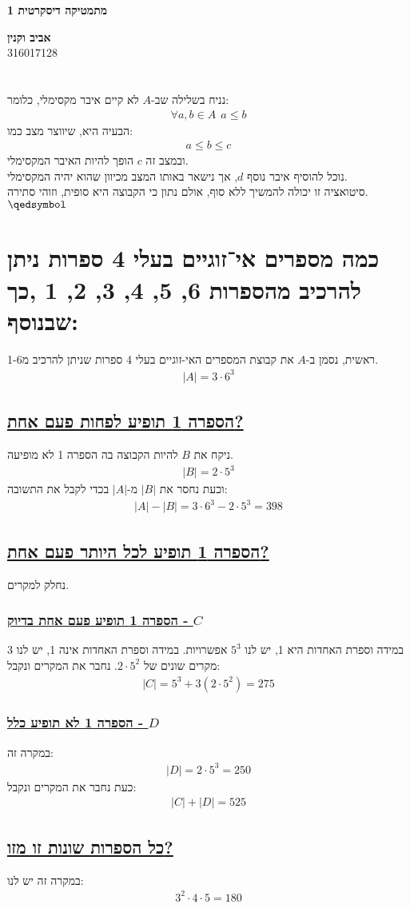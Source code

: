 \documentclass[a4paper, 12pt, leqno]{article}
\newcommand{\sub}[1]{\subsection{\underline{#1}}}
\newcommand{\subsub}[1]{\subsubsection{\underline{#1}}}
\newcommand{\eq}[1]{\begin{align*}#1\end{align*}}
\renewcommand{\qed}{\hfill\(\qedsymbol\)}
\renewcommand{\leq}{\leqslant}
\begin{document}
\begin{titlepage}
    \begin{center}
        \vspace*{4cm}
    
        {\fontsize{32pt}{32pt}\selectfont \textbf{מתמטיקה דיסקרטית 1}}
        
        \vspace{0.4cm}
        
        {}
    
        \vfill
            
        {
            \Large\textbf{אביב וקנין}
            \\
            316017128
        }
    \end{center}
\end{titlepage}



\setcounter{section}{2}
\section{}
נניח בשלילה שב-$A$ לא קיים איבר מקסימלי, כלומר:
\eq{
    \forall{a,b}\in{A}~~a\leq{b}
}
הבעיה היא, שיווצר מצב כמו:
\eq{
    a\leq{b}\leq{c}
}
ובמצב זה $c$ הופך להיות האיבר המקסימלי.\\
נוכל להוסיף איבר נוסף $d$, אך נישאר באותו המצב מכיוון שהוא יהיה המקסימלי.\\
סיטואציה זו יכולה להמשיך ללא סוף, אולם נתון כי הקבוצה היא סופית, וזוהי סתירה.
\qed

\section{כמה מספרים אי־זוגיים בעלי 4 ספרות ניתן להרכיב מהספרות 6, 5, 4, 3, 2, 1 ,כך שבנוסף:}
ראשית, נסמן ב-$A$ את קבוצת המספרים האי-זוגיים בעלי 4 ספרות שניתן להרכיב מ1-6.
\eq{
    |A|=3\cdot6^3
}
\sub{הספרה 1 תופיע לפחות פעם אחת?}
ניקח את $B$ להיות הקבוצה בה הספרה 1 לא מופיעה.
\eq{
    |B|=2\cdot5^3
}
וכעת נחסר את $|B|$ מ-$|A|$ בכדי לקבל את התשובה:
\eq{
    |A|-|B|=3\cdot6^3-2\cdot5^3=398
}
\sub{הספרה 1 תופיע לכל היותר פעם אחת?}
נחלק למקרים.
\subsub{הספרה 1 תופיע פעם אחת בדיוק - $C$}
במידה וספרת האחדות היא 1, יש לנו $5^3$ אפשרויות.
במידה וספרת האחדות אינה 1, יש לנו 3 מקרים שונים של $2\cdot5^2$.
נחבר את המקרים ונקבל:
\eq{
    |C| = 5^3+3(2\cdot5^2) = 275
}
\subsub{הספרה 1 לא תופיע כלל - $D$}
במקרה זה:
\eq{
    |D|=2\cdot5^3=250
}
כעת נחבר את המקרים ונקבל:
\eq{
    |C|+|D|=525
}
\sub{כל הספרות שונות זו מזו?}
במקרה זה יש לנו:
\eq{
    3^2\cdot4\cdot5=180
}
\end{document}
